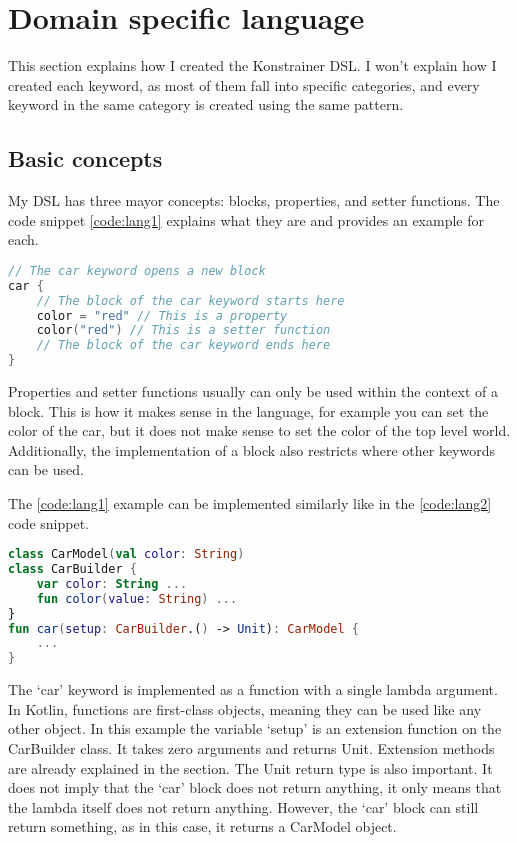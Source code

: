 \section{Domain specific language}

This section explains how I created the Konstrainer DSL. I won't explain how I created each keyword, as most of them fall into specific categories, and every keyword in the same category is created using the same pattern.

\subsection{Basic concepts}

My DSL has three mayor concepts: blocks, properties, and setter functions. The code snippet \ref{code:lang1} explains what they are and provides an example for each.

\begin{lstlisting}[caption={Language concepts},language=Kotlin,label=code:lang1]
// The car keyword opens a new block
car { 
    // The block of the car keyword starts here
    color = "red" // This is a property
    color("red") // This is a setter function
    // The block of the car keyword ends here
}
\end{lstlisting}

Properties and setter functions usually can only be used within the context of a block. This is how it makes sense in the language, for example you can set the color of the car, but it does not make sense to set the color of the top level world. Additionally, the implementation of a block also restricts where other keywords can be used.

The \ref{code:lang1} example can be implemented similarly like in the \ref{code:lang2} code snippet.

\begin{lstlisting}[caption={Basic idea behind a block},language=Kotlin,label=code:lang2]
class CarModel(val color: String)
class CarBuilder {
    var color: String ...
    fun color(value: String) ...
}
fun car(setup: CarBuilder.() -> Unit): CarModel {
    ...
}
\end{lstlisting}

The `car' keyword is implemented as a function with a single lambda argument. In Kotlin, functions are first-class objects, meaning they can be used like any other object. In this example the variable `setup' is an extension function on the CarBuilder class. It takes zero arguments and returns Unit. Extension methods are already explained in the  section. The Unit return type is also important. It does not imply that the `car' block does not return anything, it only means that the lambda itself does not return anything. However, the `car' block can still return something, as in this case, it returns a CarModel object.


